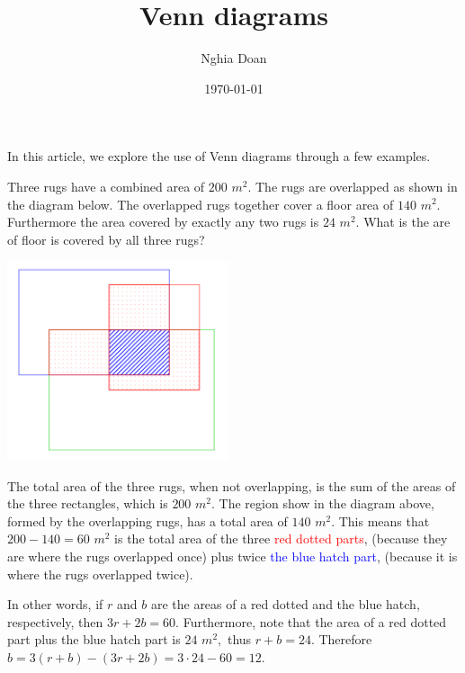 \documentclass{article}
\title{Venn diagrams}
\author{Nghia Doan}
\date{\today}
\begin{document}
\maketitle

In this article, we explore the use of Venn diagrams through a few examples.

\begin{example*}

    Three rugs have a combined area of $200$ $m^2.$ The rugs are overlapped as shown in the diagram below.
    The overlapped rugs together cover a floor area of $140$ $m^2.$ Furthermore the area covered by exactly any two rugs is $24$ $m^2$. 
	What is the are of floor is covered by all three rugs?
\end{example*}

\begin{center}
    \includegraphics[width=6.5cm]{./svg/pdf/pi-2023-01-01.pdf}
\end{center}

\begin{soln}
    The total area of the three rugs, when not overlapping, is the sum of the areas of the three rectangles, which is $200$ $m^2.$
    The region show in the diagram above, formed by the overlapping rugs, has a total area of $140$ $m^2.$
	This means that $200-140=60$ $m^2$ is the total area of the three \textcolor{red}{red dotted parts},
    (because they are where the rugs overlapped once) plus twice \textcolor{blue}{the blue hatch part},
    (because it is where the rugs overlapped twice).

    In other words, if $r$ and $b$ are the areas of a red dotted and the blue hatch, respectively, then $3r + 2b = 60.$
    Furthermore, note that the area of a red dotted part plus the blue hatch part is $24$ $m^2,$ thus $r + b = 24.$
    Therefore $b = 3(r + b)- (3r+2b) = 3 \cdot 24 - 60 = \boxed{12}.$
\end{soln}
\end{document}
